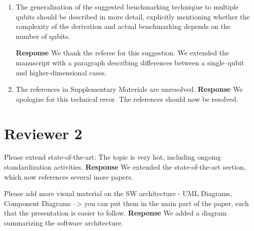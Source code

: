\documentclass[a4paper,12pt]{article}
\newcommand{\1}{{\rm 1\hspace{-0.9mm}l}}
\newenvironment{response}{\vspace{1em}\noindent\textbf{Response}}{\vspace{1em}}
\begin{document}
\begin{enumerate}
    \begin{response}
      We modified manuscript to include mention of cross-entropy benchmarking
      as suggested by the referee.
    \end{response}
  \item The generalization of the suggested benchmarking techniqiue to multiple
    qubits should be described in more detail, explicitly mentioning whether
    the complexity of the derivation and actual benchmarking depends on the
    number of qubits.

    \begin{response}
      We thank the referee for this suggestion. We extended the manuscript with
      a paragraph describing differences between a single--qubit and
      higher-dimensional cases.
    \end{response}
  \item The references in Supplementary Materials are unresolved.
    \begin{response}
      We apologize for this technical error. The references should now be resolved.
    \end{response}
\end{enumerate}
\section{Reviewer 2}
\item Please extend state-of-the-art: The topic is very hot, including ongoing
  standardization activities.
  \begin{response}
    We extended the state-of-the-art section, which now references several more papers.
  \end{response}
  \item Please add more visual material on the SW architecture - UML Diagrams, Component
  Diagrams --> you can put them in the main part of the paper, such
  that the presentation is easier to follow.
  \begin{response}
    We added a diagram summarizing the software architecture.
  \end{response}
\end{document}
